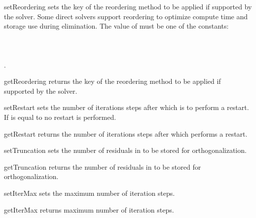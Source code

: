 \begin{methoddesc}[SolverOptions]{setReordering}{}
sets the key of the reordering method to be applied if supported by the solver.
Some direct solvers support reordering to optimize compute time and storage
use during elimination. The value of  must be one of the
constants:\\
 \\
 \\
 \\
 .
\end{methoddesc}

\begin{methoddesc}[SolverOptions]{getReordering}{}
returns the key of the reordering method to be applied if supported by the solver.
\end{methoddesc}

\begin{methoddesc}[SolverOptions]{setRestart}{}
sets the number of iterations steps after which \GMRES is to perform a restart.
If  is equal to  no restart is performed.
\end{methoddesc}

\begin{methoddesc}[SolverOptions]{getRestart}{}
returns the number of iterations steps after which \GMRES performs a restart.
\end{methoddesc}

\begin{methoddesc}[SolverOptions]{setTruncation}{}
sets the number of residuals in \GMRES to be stored for orthogonalization.
\end{methoddesc}

\begin{methoddesc}[SolverOptions]{getTruncation}{}
returns the number of residuals in \GMRES to be stored for orthogonalization.
\end{methoddesc}


\begin{methoddesc}[SolverOptions]{setIterMax}{}
sets the maximum number of iteration steps.
\end{methoddesc}

\begin{methoddesc}[SolverOptions]{getIterMax}{}
returns maximum number of iteration steps.
\end{methoddesc}

